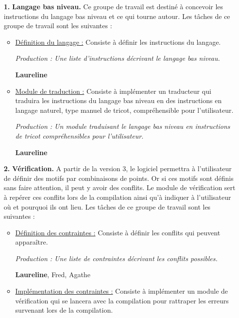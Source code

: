 \documentclass{article}
\begin{document}
\begin{itemize}
\item[\textbf{1.}] \textbf{Langage bas niveau.} Ce groupe de travail est destiné à concevoir les instructions du langage bas niveau et ce qui tourne
autour. Les tâches de ce groupe de travail sont les suivantes :

    \begin{itemize}
    \item \underline{Définition du langage :} Consiste à définir les instructions du langage.

      \textit{Production : Une liste d'instructions décrivant le langage bas niveau.}

      \textbf{Laureline}

    \item \underline{Module de traduction :} Consiste à implémenter un traducteur qui traduira les instructions du langage bas niveau en des
instructions en langage naturel, type manuel de tricot, compréhensible pour l'utilisateur.

      \textit{Production : Un module traduisant le langage bas niveau en instructions de tricot compréhensibles pour l'utilisateur.}

      \textbf{Laureline}
    \end{itemize}

\medskip

\item[\textbf{2.}] \textbf{Vérification.} A partir de la version 3, le logiciel permettra à l'utilisateur de définir des motifs par combinaisons de
points. Or si ces motifs sont définis sans faire attention, il peut y avoir des conflits. Le module de vérification sert à repérer ces
conflits lors de la compilation ainsi qu'à indiquer à l'utilisateur où et pourquoi ils ont lieu. Les tâches de ce groupe de travail sont
les suivantes :

    \begin{itemize}
    \item \underline{Définition des contraintes :} Consiste à définir les conflits qui peuvent apparaître.

      \textit{Production : Une liste de contraintes décrivant les conflits possibles.}

      \textbf{Laureline}, Fred, Agathe

    \item \underline{Implémentation des contraintes :} Consiste à implémenter un module de vérification qui se lancera avec la compilation pour
rattraper les erreurs survenant lors de la compilation.


\end{itemize}
\end{itemize}
\end{document}
